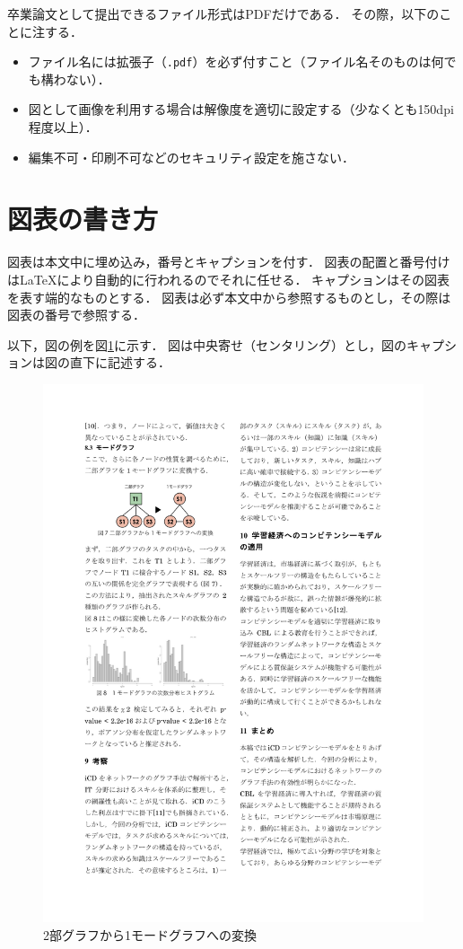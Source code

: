 \documentclass[a4paper,twocolumn,10pt]{ltjsarticle}
\begin{document}
卒業論文として提出できるファイル形式はPDFだけである．
その際，以下のことに注する．

\begin{itemize}
 \item ファイル名には拡張子（{\tt .pdf}）を必ず付すこと（ファイル名そのものは何でも構わない）．
 \item 図として画像を利用する場合は解像度を適切に設定する（少なくとも150dpi程度以上）．
 \item 編集不可・印刷不可などのセキュリティ設定を施さない．
\end{itemize}

\section{図表の書き方}

図表は本文中に埋め込み，番号とキャプションを付す．
図表の配置と番号付けは\LaTeX{}により自動的に行われるのでそれに任せる．
キャプションはその図表を表す端的なものとする．
図表は必ず本文中から参照するものとし，その際は図表の番号で参照する．

以下，図の例を図\ref{fig:graphs}に示す．
図は中央寄せ（センタリング）とし，図のキャプションは図の直下に記述する．

\begin{figure}[htb]
 \begin{center}
  \includegraphics{graphs.pdf}
  \caption{2部グラフから1モードグラフへの変換}
  \label{fig:graphs}
 \end{center}
\end{figure}
\end{document}
